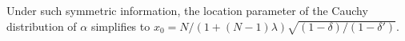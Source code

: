 \documentclass[12pt]{article}
\theoremstyle{definition}
\theoremstyle{definition}
\begin{document}
Under such symmetric information, the location parameter of the Cauchy distribution of $\alpha$
simplifies to
$x_0 = N/(1+(N-1)\lambda)  \sqrt{(1-\delta)/(1-\delta')}$. 
\end{document}
